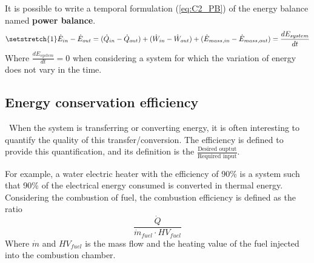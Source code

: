 It is possible to write a temporal formulation (\ref{eq:C2_PB}) of the energy balance named \textbf{power balance}.  
\begin{equation}
\setstretch{1}
    \dot{E}_{in} - \dot{E}_{out} = (\dot{Q}_{in} - \dot{Q}_{out}) + (\dot{W}_{in} - \dot{W}_{out}) + (\dot{E}_{mass,in} - \dot{E}_{mass,out}) = \frac{dE_{system}}{dt} \label{eq:C2_PB}
\end{equation}
Where $\frac{dE_{system}}{dt}=0$ when considering a system for which the variation of energy does not vary in the time.
\subsection{Energy conservation efficiency}
\quad\, When the system is transferring or converting energy, it is often interesting to quantify the quality of this transfer/conversion. The efficiency is defined to provide this quantification, and its definition is the
$\frac{\text{Desired ouptut}}{\text{Required input}}$. 

For example, a water electric heater with the efficiency of 90\% is a system such that 90\% of the electrical energy consumed is converted in thermal energy.  
Considering the combustion of fuel, the combustion efficiency is defined as the ratio
$$ \frac{\dot{Q}}{\dot{m}_{fuel}\cdot HV_{fuel}}$$
Where $\dot{m}$  and $HV_{fuel}$ is the mass flow and the heating value of the fuel injected into the combustion chamber.

